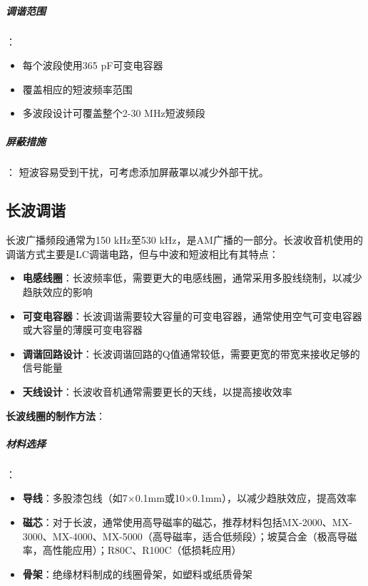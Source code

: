 \subparagraph{调谐范围}：
\begin{itemize}
    \item 每个波段使用365 pF可变电容器
    \item 覆盖相应的短波频率范围
    \item 多波段设计可覆盖整个2-30 MHz短波频段
\end{itemize}

\subparagraph{屏蔽措施}：
短波容易受到干扰，可考虑添加屏蔽罩以减少外部干扰。

\subsection{长波调谐}
\label{sec:lw_tuning_application}

长波广播频段通常为150 kHz至530 kHz，是AM广播的一部分。长波收音机使用的调谐方式主要是LC调谐电路，但与中波和短波相比有其特点：

\begin{itemize}
  \item \textbf{电感线圈}：长波频率低，需要更大的电感线圈，通常采用多股线绕制，以减少趋肤效应的影响
  \item \textbf{可变电容器}：长波调谐需要较大容量的可变电容器，通常使用空气可变电容器或大容量的薄膜可变电容器
  \item \textbf{调谐回路设计}：长波调谐回路的Q值通常较低，需要更宽的带宽来接收足够的信号能量
  \item \textbf{天线设计}：长波收音机通常需要更长的天线，以提高接收效率
\end{itemize}

\textbf{长波线圈的制作方法}：

\subparagraph{材料选择}：
\begin{itemize}
  \item \textbf{导线}：多股漆包线（如7×0.1mm或10×0.1mm），以减少趋肤效应，提高效率
  \item \textbf{磁芯}：对于长波，通常使用高导磁率的磁芯，推荐材料包括MX-2000、MX-3000、MX-4000、MX-5000（高导磁率，适合低频段）；坡莫合金（极高导磁率，高性能应用）；R80C、R100C（低损耗应用）
  \item \textbf{骨架}：绝缘材料制成的线圈骨架，如塑料或纸质骨架
\end{itemize}

